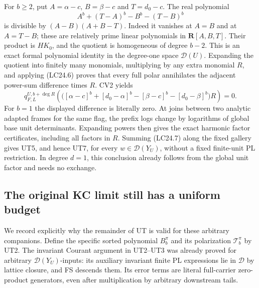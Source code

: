 For \(b\ge2\), put \(A=\alpha-c\), \(B=\beta-c\) and
\(T=d_0-c\). The real polynomial
\[
 A^b+(T-A)^b-B^b-(T-B)^b
\]
is divisible by \((A-B)(A+B-T)\). Indeed it vanishes at
\(A=B\) and at \(A=T-B\); these are relatively prime linear
polynomials in \(\mathbf R[A,B,T]\).
Their product is \(H K_0\), and the quotient is homogeneous of
degree \(b-2\). This is an exact formal polynomial identity
in the degree-one space \(\mathcal D(U)\).
Expanding the quotient into finitely many monomials, multiplying
by any extra monomial \(R\), and applying (LC24.6) proves that
every full polar annihilates the adjacent power-sum difference
times \(R\). CV2 yields
\[
 q^{U,b+\deg R}_{F,L}
 \left(
   \bigl([\alpha-c]^b+[d_0-\alpha]^b
        -[\beta-c]^b-[d_0-\beta]^b\bigr)R
 \right)=0.                                                 \tag{LC24.7}
\]
For \(b=1\) the displayed difference is literally zero.
At joins between two analytic adapted frames for the same flag,
the prefix logs change by logarithms of global base unit
determinants. Expanding powers then gives the exact harmonic
factor certificates, including all factors in \(R\).
Summing (LC24.7) along the fixed gallery gives UT5, and hence
UT7, for every \(w\in\mathcal D(Y_U)\), without a fixed
finite-unit PL restriction. In degree \(d=1\), this conclusion
already follows from the global unit factor and needs no exchange.

\subsection{The original KC limit still has a uniform budget}

We record explicitly why the remainder of UT is valid for these
arbitrary companions. Define the specific sorted polynomial
\(B_b^\pi\) and its polarization \(\mathcal T_b^\pi\) by UT2.
The invariant Courant argument in UT2--UT3 was already proved
for arbitrary \(\mathcal D(Y_U)\)-inputs: its auxiliary invariant
finite PL expressions lie in \(\mathcal D\) by lattice closure,
and FS descends them. Its error terms are literal full-carrier
zero-product generators, even after multiplication by arbitrary
downstream tails.

